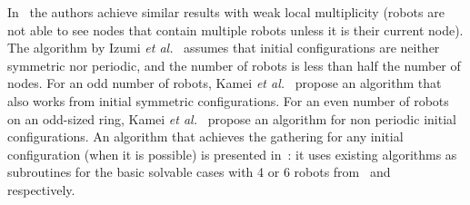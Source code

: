 In~\cite{IIKO10c, KLOT11, KLOT12} the authors achieve similar results with weak local multiplicity (robots are not able to see nodes that contain multiple robots unless it is their current node). 
The algorithm by Izumi \textit{et al.}~\cite{IIKO10c} assumes that initial configurations are neither symmetric nor periodic, and the number of robots is less than half the number of nodes. 
For an odd number of robots, %
Kamei \textit{et al.}~\cite{KLOT11} propose an algorithm that also works from initial symmetric configurations. 
For an even number of robots on an odd-sized ring, Kamei \textit{et al.}~\cite{KLOT12} propose an algorithm for non periodic initial configurations. %
An algorithm that achieves the gathering for any initial configuration (when it is possible) is presented in~\cite{DAngeloSN14}: 
it uses existing algorithms as subroutines for the basic solvable cases with 4 or 6 robots from~\cite{4Rob} and~\cite{ASN11c} respectively.



 

